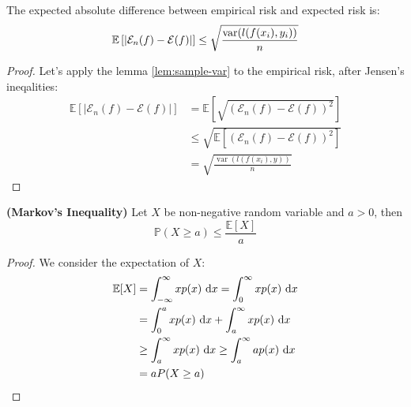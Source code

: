 \begin{proposition}
    The expected absolute difference between empirical risk and expected risk is:
    \begin{equation*}
        \mathbb{E}\left[ \left| \mathcal{E}_n(f) - \mathcal{E}(f) \right| \right] \le \sqrt{\frac{\operatorname{var}(l(f(x_i), y_i))}{n}}
    \end{equation*}
\end{proposition}
\begin{proof}
    Let's apply the lemma \ref{lem:sample-var} to the empirical risk, after Jensen's ineqalities:
    \begin{equation*}
    \begin{aligned}
        \mathbb{E}[|\mathcal{E}_n(f) - \mathcal{E}(f)|] &= \mathbb{E}[\sqrt{(\mathcal{E}_n(f) - \mathcal{E}(f))^2}] \\
        &\le \sqrt{\mathbb{E}[(\mathcal{E}_n(f) - \mathcal{E}(f))^2]} \\
        &= \sqrt{\frac{\operatorname{var}(l(f(x_i), y))}{n}}
    \end{aligned}
    \end{equation*}
\end{proof}

\begin{theorem}{\textbf{(Markov's Inequality)}}
    Let $X$ be non-negative random variable and $a>0$, then
    \begin{equation*}
        \mathbb{P}(X\ge a)\le\frac{\mathbb{E}[X]}{a}
    \end{equation*}
\end{theorem}
\begin{proof}
    We consider the expectation of $X$:
    \begin{equation*}
    \begin{aligned}
        \mathbb{E}[X] &= \int^\infty_{-\infty} xp(x)\ \mathrm{d} x = \int^\infty_0 xp(x)\ \mathrm{d} x \\
        &= \int^a_0 xp(x)\ \mathrm{d} x +\int^\infty_a xp(x)\ \mathrm{d} x \\
        &\ge \int^\infty_a xp(x)\ \mathrm{d} x \ge \int^\infty_a ap(x)\ \mathrm{d} x \\
        &=aP(X\ge a)
    \end{aligned}
    \end{equation*}
\end{proof}


